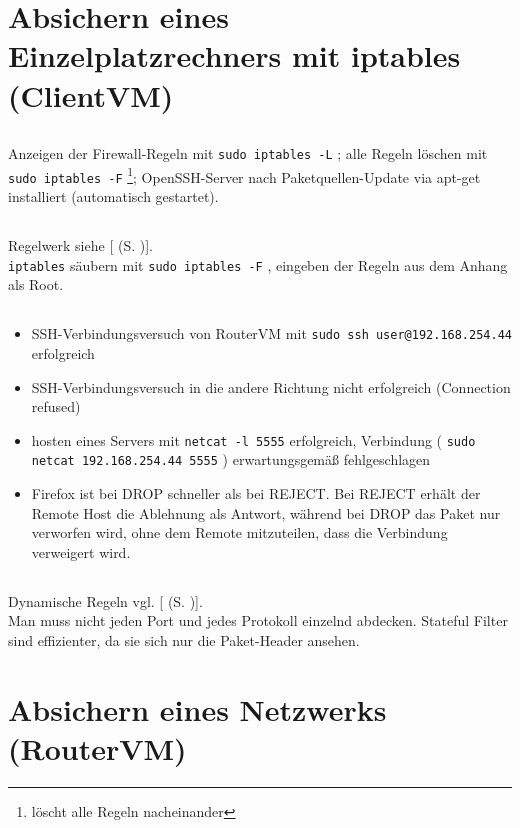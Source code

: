 \documentclass[twoside]{article}
\newcommand{\ttt}[1]{%
	\texttt{#1}%
}
\newcommand{\mref}[1]{[\nameref{#1} (S. \pageref{#1})]}
\begin{document}
\section{Absichern eines Einzelplatzrechners mit iptables (ClientVM)}
\label{sec:securing-workplace}
	\subsection{}
	\label{ssec:2.1}
	Anzeigen der Firewall-Regeln mit \ttt{sudo iptables -L}; alle Regeln löschen mit \ttt{sudo iptables -F}\footnote{löscht alle Regeln nacheinander}; OpenSSH-Server nach Paketquellen-Update via apt-get installiert (automatisch gestartet).
	\subsection{}
	\label{ssec:2.2}
	Regelwerk siehe \mref{2.2-1}.\\
	\ttt{iptables} säubern mit \ttt{sudo iptables -F}, eingeben der Regeln aus dem Anhang als Root.
	\subsection{}
	\label{ssec:2.3}
	\begin{itemize}
		\item SSH-Verbindungsversuch von RouterVM mit \ttt{sudo ssh user@192.168.254.44} erfolgreich
		\item SSH-Verbindungsversuch in die andere Richtung nicht erfolgreich (Connection refused)
		\item hosten eines Servers mit \ttt{netcat -l 5555} erfolgreich, Verbindung (\ttt{sudo netcat 192.168.254.44 5555}) erwartungsgemäß fehlgeschlagen
		\item Firefox ist bei DROP schneller als bei REJECT.
			Bei REJECT erhält der Remote Host die Ablehnung als Antwort, während bei DROP das Paket nur verworfen wird, ohne dem Remote mitzuteilen, dass die Verbindung verweigert wird.
	\end{itemize}
	\subsection{}
	\label{ssec:2.4}
	Dynamische Regeln vgl. \mref{2.4-1}.\\
	Man muss nicht jeden Port und jedes Protokoll einzelnd abdecken.
	Stateful Filter sind effizienter, da sie sich nur die Paket-Header ansehen.
\section{Absichern eines Netzwerks (RouterVM)}
\label{sec:securing-network}
\end{document}
